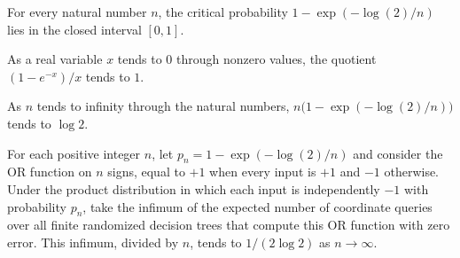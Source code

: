 \begin{theorem}
\label{FABL.orCriticalProbability_mem_Icc}
\leanok
{}
For every natural number $n$, the critical probability $1-\exp(-\log(2)/n)$ lies in the
closed interval $[0,1]$.
\end{theorem}

\begin{theorem}
\label{FABL.tendsto_one_sub_exp_neg_div}
\leanok
{}
As a real variable $x$ tends to $0$ through nonzero values, the quotient $(1-e^{-x})/x$
tends to $1$.
\end{theorem}

\begin{theorem}
\label{FABL.tendsto_nat_mul_orCriticalProbability}
\leanok
{}
As $n$ tends to infinity through the natural numbers, $n\bigl(1-\exp(-\log(2)/n)\bigr)$
tends to $\log 2$.
\end{theorem}

\begin{theorem}
\label{FABL.tendsto_averageComplexity_or_at_critical}
\leanok
{}
For each positive integer $n$, let $p_n=1-\exp(-\log(2)/n)$ and consider the OR function
on $n$ signs, equal to $+1$ when every input is $+1$ and $-1$ otherwise. Under the
product distribution in which each input is independently $-1$ with probability $p_n$,
take the infimum of the expected number of coordinate queries over all finite randomized
decision trees that compute this OR function with zero error. This infimum, divided by
$n$, tends to $1/(2\log 2)$ as $n\to\infty$.
\end{theorem}

